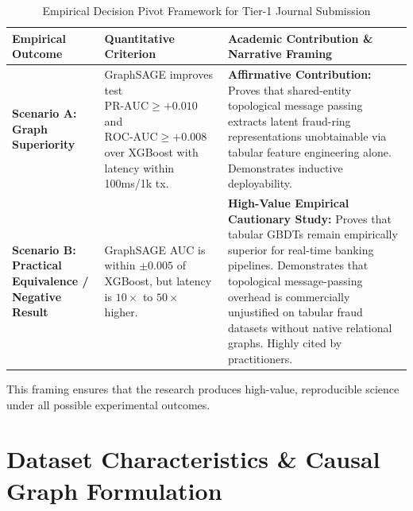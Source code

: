 \documentclass[11pt,a4paper]{article}
\begin{document}
\begin{table}[htbp]
\centering
\small
\caption{Empirical Decision Pivot Framework for Tier-1 Journal Submission}
\label{tab:pivot_rule}
\begin{tabular}{p{2.8cm}p{4.2cm}p{7.5cm}}
\toprule
\textbf{Empirical Outcome} & \textbf{Quantitative Criterion} & \textbf{Academic Contribution \& Narrative Framing} \\
\midrule
\textbf{Scenario A: Graph Superiority} & GraphSAGE improves test $\text{PR-AUC} \ge +0.010$ and $\text{ROC-AUC} \ge +0.008$ over XGBoost with latency within 100ms/1k tx. & \textbf{Affirmative Contribution:} Proves that shared-entity topological message passing extracts latent fraud-ring representations unobtainable via tabular feature engineering alone. Demonstrates inductive deployability. \\
\midrule
\textbf{Scenario B: Practical Equivalence / Negative Result} & GraphSAGE AUC is within $\pm 0.005$ of XGBoost, but latency is $10\times$ to $50\times$ higher. & \textbf{High-Value Empirical Cautionary Study:} Proves that tabular GBDTs remain empirically superior for real-time banking pipelines. Demonstrates that topological message-passing overhead is commercially unjustified on tabular fraud datasets without native relational graphs. Highly cited by practitioners. \\
\bottomrule
\end{tabular}
\end{table}

This framing ensures that the research produces high-value, reproducible science under all possible experimental outcomes.

\section{Dataset Characteristics \& Causal Graph Formulation}
\end{document}
